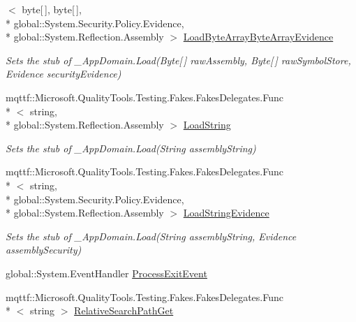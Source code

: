 \begin{DoxyCompactItemize}
$<$ byte\mbox{[}$\,$\mbox{]}, byte\mbox{[}$\,$\mbox{]}, \\*
global\-::\-System.\-Security.\-Policy.\-Evidence, \\*
global\-::\-System.\-Reflection.\-Assembly $>$ \hyperlink{class_system_1_1_fakes_1_1_stub___app_domain_a406e555e91840f82cfa010650e553f8a}{Load\-Byte\-Array\-Byte\-Array\-Evidence}
\begin{DoxyCompactList}\small\item\em Sets the stub of \-\_\-\-App\-Domain.\-Load(\-Byte\mbox{[}$\,$\mbox{]} raw\-Assembly, Byte\mbox{[}$\,$\mbox{]} raw\-Symbol\-Store, Evidence security\-Evidence)\end{DoxyCompactList}\item 
mqttf\-::\-Microsoft.\-Quality\-Tools.\-Testing.\-Fakes.\-Fakes\-Delegates.\-Func\\*
$<$ string, \\*
global\-::\-System.\-Reflection.\-Assembly $>$ \hyperlink{class_system_1_1_fakes_1_1_stub___app_domain_ad13b6d5b06033084171149e73dc4bdf8}{Load\-String}
\begin{DoxyCompactList}\small\item\em Sets the stub of \-\_\-\-App\-Domain.\-Load(\-String assembly\-String)\end{DoxyCompactList}\item 
mqttf\-::\-Microsoft.\-Quality\-Tools.\-Testing.\-Fakes.\-Fakes\-Delegates.\-Func\\*
$<$ string, \\*
global\-::\-System.\-Security.\-Policy.\-Evidence, \\*
global\-::\-System.\-Reflection.\-Assembly $>$ \hyperlink{class_system_1_1_fakes_1_1_stub___app_domain_ab7ae3c6e6b27a52a39860fd5ca6789e6}{Load\-String\-Evidence}
\begin{DoxyCompactList}\small\item\em Sets the stub of \-\_\-\-App\-Domain.\-Load(\-String assembly\-String, Evidence assembly\-Security)\end{DoxyCompactList}\item 
global\-::\-System.\-Event\-Handler \hyperlink{class_system_1_1_fakes_1_1_stub___app_domain_ab757889eabac281e0703717f1a43b202}{Process\-Exit\-Event}
\item 
mqttf\-::\-Microsoft.\-Quality\-Tools.\-Testing.\-Fakes.\-Fakes\-Delegates.\-Func\\*
$<$ string $>$ \hyperlink{class_system_1_1_fakes_1_1_stub___app_domain_a41bbe167a67f0e955dc974e757b7e031}{Relative\-Search\-Path\-Get}

\end{DoxyCompactItemize}
